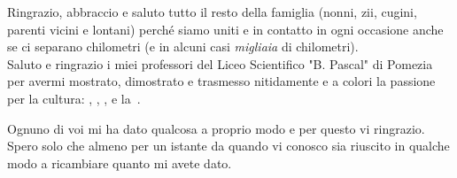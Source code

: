Ringrazio, abbraccio e saluto tutto il resto della famiglia (nonni, zii, cugini, parenti vicini e lontani) perché siamo uniti e in contatto in ogni occasione anche se ci separano chilometri (e in alcuni casi \emph{migliaia} di chilometri).\\
Saluto e ringrazio i miei professori del Liceo Scientifico "B. Pascal" di Pomezia per avermi mostrato, dimostrato e trasmesso nitidamente e a colori la passione per la cultura: , , ,  e la~.

Ognuno di voi mi ha dato qualcosa a proprio modo e per questo vi ringrazio. Spero solo che almeno per un istante da quando vi conosco sia riuscito in qualche modo a ricambiare quanto mi avete dato.